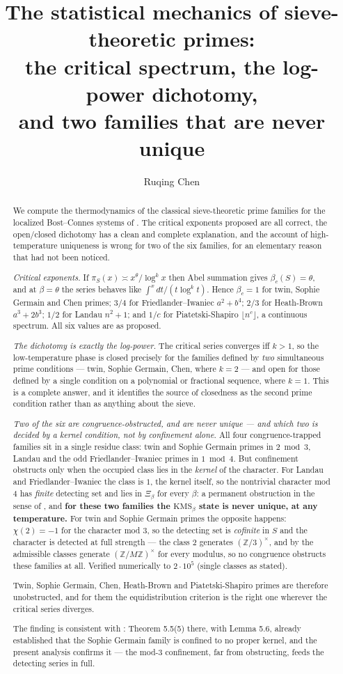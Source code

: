 \documentclass[11pt]{amsart}
\title[Sieve primes and their phases]{The statistical mechanics of sieve-theoretic primes:\\ the critical spectrum, the log-power dichotomy,\\ and two families that are never unique}
\author{Ruqing Chen}
\date{}
\numberwithin{equation}{section}
\theoremstyle{definition}
\theoremstyle{remark}
\newcommand{\Z}{\mathbb{Z}}
\begin{document}
\begin{abstract}
We compute the thermodynamics of the classical sieve-theoretic prime families for the
localized Bost--Connes systems of \cite{Main}. The critical exponents proposed are all
correct, the open/closed dichotomy has a clean and complete explanation, and the account of
high-temperature uniqueness is wrong for two of the six families, for an elementary reason
that had not been noticed.

\emph{Critical exponents.} If $\pi_S(x)\asymp x^\theta/\log^kx$ then Abel summation gives
$\beta_c(S)=\theta$, and at $\beta=\theta$ the series behaves like $\int^x dt/(t\log^kt)$.
Hence $\beta_c=1$ for twin, Sophie Germain and Chen primes; $3/4$ for
Friedlander--Iwaniec $a^2+b^4$; $2/3$ for Heath-Brown $a^3+2b^3$; $1/2$ for Landau $n^2+1$;
and $1/c$ for Piatetski-Shapiro $\lfloor n^c\rfloor$, a continuous spectrum. All six values
are as proposed.

\emph{The dichotomy is exactly the log-power.} The critical series converges iff $k>1$, so the
low-temperature phase is closed precisely for the families defined by \emph{two}
simultaneous prime conditions --- twin, Sophie Germain, Chen, where $k=2$ --- and open for
those defined by a single condition on a polynomial or fractional sequence, where $k=1$. This
is a complete answer, and it identifies the source of closedness as the second prime
condition rather than as anything about the sieve.

\emph{Two of the six are congruence-obstructed, and are never unique --- and which two is
decided by a kernel condition, not by confinement alone.} All four congruence-trapped
families sit in a single residue class: twin and Sophie Germain primes in $2\bmod3$, Landau
and the odd Friedlander--Iwaniec primes in $1\bmod4$. But confinement obstructs only when the
occupied class lies in the \emph{kernel} of the character. For Landau and
Friedlander--Iwaniec the class is $1$, the kernel itself, so the nontrivial character mod $4$
has \emph{finite} detecting set and lies in $\Xi_\beta$ for every $\beta$: a permanent
obstruction in the sense of \cite[\S4.1]{Main}, and \textbf{for these two families the
$\mathrm{KMS}_\beta$ state is never unique, at any temperature.} For twin and Sophie Germain
primes the opposite happens: $\chi(2)=-1$ for the character mod $3$, so the detecting set is
\emph{cofinite} in $S$ and the character is detected at full strength --- the class $2$
generates $(\Z/3)^\times$, and by \cite[Lem.~5.6]{Main} the admissible classes generate
$(\Z/M\Z)^\times$ for every modulus, so no congruence obstructs these families at all.
Verified numerically to $2\cdot10^5$ (single classes as stated).

Twin, Sophie Germain, Chen, Heath-Brown and Piatetski-Shapiro primes are therefore
unobstructed, and for them the equidistribution criterion is the right one wherever the
critical series diverges.

The finding is consistent with \cite[\S5]{Main}: Theorem 5.5(5) there, with Lemma 5.6,
already established that the Sophie Germain family is confined to no proper kernel, and the
present analysis confirms it --- the mod-$3$ confinement, far from obstructing, feeds the
detecting series in full.
\end{abstract}
\end{document}
